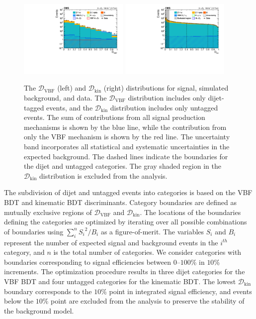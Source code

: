 \begin{figure}[tbp!]
\centering
\includegraphics[width=0.47\textwidth]{fig/bdt/Figure_002-a.pdf}
\includegraphics[width=0.47\textwidth]{fig/bdt/Figure_002-b.pdf}
 \caption{The $\mathcal{D}_{\mathrm{VBF}}$ (left) and $\mathcal{D}_{\mathrm{kin}}$ (right) distributions for signal, simulated background, and data. 
	  The $\mathcal{D}_{\mathrm{VBF}}$ distribution includes
	  only dijet-tagged events, and the $\mathcal{D}_{\mathrm{kin}}$ distribution includes only untagged events. The sum of contributions from all signal production mechanisms is shown by the blue line, while the contribution from only the VBF mechanism is shown by the red line. The uncertainty band incorporates all statistical and systematic uncertainties in the expected background. The dashed lines indicate the boundaries for the dijet and untagged categories. The gray shaded region in the $\mathcal{D}_{\mathrm{kin}}$ distribution is excluded from the analysis.\label{fig:BDT}}
\end{figure}

The subdivision of dijet and untagged events into categories is based on the VBF BDT and kinematic BDT discriminants.
Category boundaries are defined as mutually exclusive regions of $\mathcal{D}_{\mathrm{VBF}}$ and $\mathcal{D}_{\mathrm{kin}}$. 
The locations of the boundaries defining the categories are optimized by iterating over all possible combinations of boundaries using $\sum_{i}^{n} {S_i}^2/B_i$
as a figure-of-merit. The variables $S_i$ and $B_i$
represent the number of expected signal and background events in the ${i}^{th}$  
category, and $n$ is the total number of categories. 
We consider categories with boundaries corresponding to signal efficiencies  
between $0$--$100$\% in $10$\% increments.
The optimization procedure results in three dijet categories for the VBF BDT and four untagged categories for the kinematic BDT.
The lowest $\mathcal{D}_{\mathrm{kin}}$ boundary corresponds to the $10$\% point in integrated signal efficiency, 
and events below the $10$\% point are excluded from the analysis to preserve the stability of the background model.

